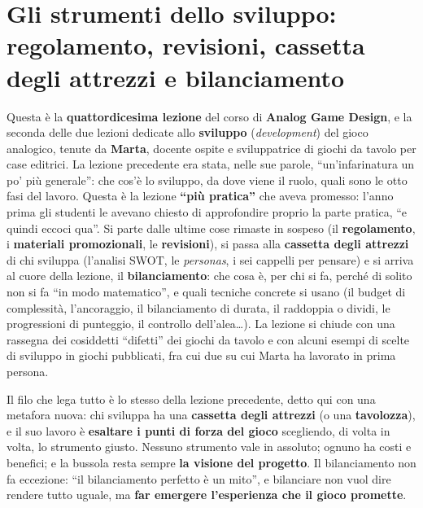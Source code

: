 \chapter[Gli strumenti dello sviluppo]{Gli strumenti dello sviluppo: regolamento,
revisioni, cassetta degli attrezzi e bilanciamento}
\label{a14:cap:strumenti}

Questa è la \textbf{quattordicesima lezione} del corso di \textbf{Analog Game Design}, e la
seconda delle due lezioni dedicate allo \textbf{sviluppo} (\emph{development}) del gioco
analogico, tenute da \textbf{Marta}, docente ospite e sviluppatrice di giochi da tavolo per
case editrici. La lezione precedente era stata, nelle sue parole, ``un'infarinatura un po'
più generale'': che cos'è lo sviluppo, da dove viene il ruolo, quali sono le otto fasi del
lavoro. Questa è la lezione \textbf{``più pratica''} che aveva promesso: l'anno prima gli
studenti le avevano chiesto di approfondire proprio la parte pratica, ``e quindi eccoci
qua''. Si parte dalle ultime cose rimaste in sospeso (il \textbf{regolamento}, i
\textbf{materiali promozionali}, le \textbf{revisioni}), si passa alla \textbf{cassetta
degli attrezzi} di chi sviluppa (l'analisi SWOT, le \emph{personas}, i sei cappelli per
pensare) e si arriva al cuore della lezione, il \textbf{bilanciamento}: che cosa è, per chi
si fa, perché di solito non si fa ``in modo matematico'', e quali tecniche concrete si usano
(il budget di complessità, l'ancoraggio, il bilanciamento di durata, il raddoppia o dividi,
le progressioni di punteggio, il controllo dell'alea\ldots). La lezione si chiude con una
rassegna dei cosiddetti ``difetti'' dei giochi da tavolo e con alcuni esempi di scelte di
sviluppo in giochi pubblicati, fra cui due su cui Marta ha lavorato in prima persona.

Il filo che lega tutto è lo stesso della lezione precedente, detto qui con una metafora
nuova: chi sviluppa ha una \textbf{cassetta degli attrezzi} (o una \textbf{tavolozza}), e il
suo lavoro è \textbf{esaltare i punti di forza del gioco} scegliendo, di volta in volta, lo
strumento giusto. Nessuno strumento vale in assoluto; ognuno ha costi e benefici; e la
bussola resta sempre \textbf{la visione del progetto}. Il bilanciamento non fa eccezione:
``il bilanciamento perfetto è un mito'', e bilanciare non vuol dire rendere tutto uguale, ma
\textbf{far emergere l'esperienza che il gioco promette}.

